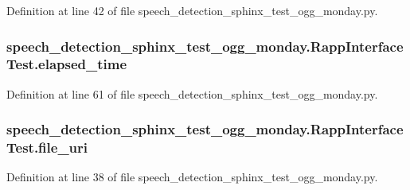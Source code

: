 Definition at line 42 of file speech\-\_\-detection\-\_\-sphinx\-\_\-test\-\_\-ogg\-\_\-monday.\-py.

\hypertarget{classspeech__detection__sphinx__test__ogg__monday_1_1RappInterfaceTest_a3f85fa18d4b2184f7bf358bba7670118}{
\subsubsection[{elapsed\-\_\-time}]{\setlength{\rightskip}{0pt plus 5cm}speech\-\_\-detection\-\_\-sphinx\-\_\-test\-\_\-ogg\-\_\-monday.\-Rapp\-Interface\-Test.\-elapsed\-\_\-time}}\label{classspeech__detection__sphinx__test__ogg__monday_1_1RappInterfaceTest_a3f85fa18d4b2184f7bf358bba7670118}


Definition at line 61 of file speech\-\_\-detection\-\_\-sphinx\-\_\-test\-\_\-ogg\-\_\-monday.\-py.

\hypertarget{classspeech__detection__sphinx__test__ogg__monday_1_1RappInterfaceTest_a710df5163a248ebf13b2a7fedbb0fd58}{
\subsubsection[{file\-\_\-uri}]{\setlength{\rightskip}{0pt plus 5cm}speech\-\_\-detection\-\_\-sphinx\-\_\-test\-\_\-ogg\-\_\-monday.\-Rapp\-Interface\-Test.\-file\-\_\-uri}}\label{classspeech__detection__sphinx__test__ogg__monday_1_1RappInterfaceTest_a710df5163a248ebf13b2a7fedbb0fd58}


Definition at line 38 of file speech\-\_\-detection\-\_\-sphinx\-\_\-test\-\_\-ogg\-\_\-monday.\-py.

